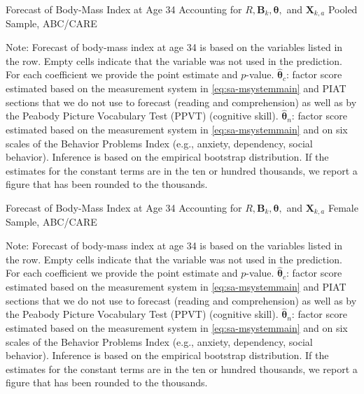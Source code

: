 \begin{table}
\begin{threeparttable}
\caption{Forecast of Body-Mass Index at Age 34 Accounting for $R, \bm{B}_k, \bm{\theta},$ and $\bm{X}_{k,a}$ Pooled Sample, ABC/CARE}
\centering
\scriptsize

\begin{tablenotes}
\footnotesize
\item Note: Forecast of body-mass index at age 34 is based on the variables listed in the row. Empty cells indicate that the variable was not used in the prediction. For each coefficient we provide the point estimate and $p$-value. $\hat{\bm{\theta}}_{c}$: factor score estimated based on the measurement system in \eqref{eq:sa-msystemmain} and PIAT sections that we do not use to forecast (reading and comprehension) as well as by the Peabody Picture Vocabulary Test (PPVT) (cognitive skill). $\hat{\bm{\theta}}_{n}$: factor score estimated based on the measurement system in \eqref{eq:sa-msystemmain} and on six scales of the Behavior Problems Index (e.g., anxiety, dependency, social behavior). Inference is based on the empirical bootstrap distribution. If the estimates for the constant terms are in the ten or hundred thousands, we report a figure that has been rounded to the thousands.
\end{tablenotes}
\end{threeparttable}
\end{table}

\begin{table}
\begin{threeparttable}
\caption{Forecast of Body-Mass Index at Age 34 Accounting for $R, \bm{B}_k, \bm{\theta},$ and $\bm{X}_{k,a}$ Female Sample, ABC/CARE}
\centering
\scriptsize

\begin{tablenotes}
\footnotesize
\item Note: Forecast of body-mass index at age 34 is based on the variables listed in the row. Empty cells indicate that the variable was not used in the prediction. For each coefficient we provide the point estimate and $p$-value. $\hat{\bm{\theta}}_{c}$: factor score estimated based on the measurement system in \eqref{eq:sa-msystemmain} and PIAT sections that we do not use to forecast (reading and comprehension) as well as by the Peabody Picture Vocabulary Test (PPVT) (cognitive skill). $\hat{\bm{\theta}}_{n}$: factor score estimated based on the measurement system in \eqref{eq:sa-msystemmain} and on six scales of the Behavior Problems Index (e.g., anxiety, dependency, social behavior). Inference is based on the empirical bootstrap distribution. If the estimates for the constant terms are in the ten or hundred thousands, we report a figure that has been rounded to the thousands.
\end{tablenotes}
\end{threeparttable}
\end{table}


